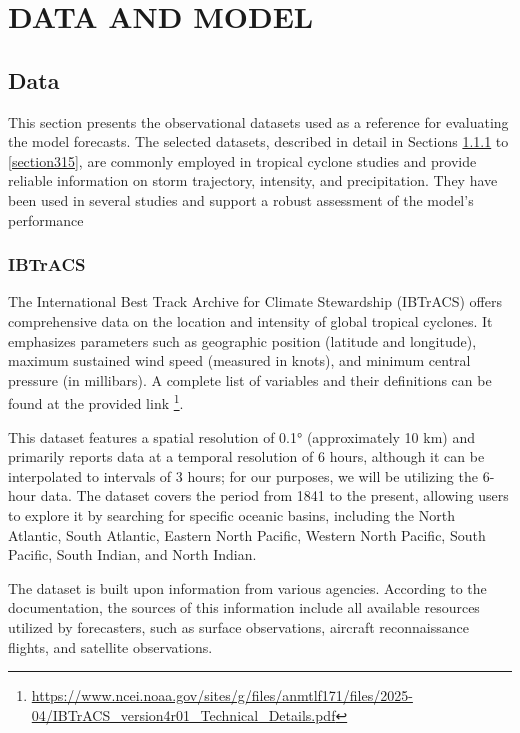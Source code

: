 \chapter{DATA AND MODEL}
\label{ch:data}

\section{Data}

This section presents the observational datasets used as a reference for evaluating the model forecasts. The selected datasets, described in detail in Sections \ref{section311} to \ref{section315}, are commonly employed in tropical cyclone studies and provide reliable information on storm trajectory, intensity, and precipitation. They have been used in several studies \cite{zhou2021regionalization, bopape2021sensitivity, dulac2024assessing, yang2024evaluation, may2024cnn} and support a robust assessment of the model's performance

\subsection{IBTrACS}
\label{section311}

The International Best Track Archive for Climate Stewardship (IBTrACS) \cite{knapp2010international} offers comprehensive data on the location and intensity of global tropical cyclones. It emphasizes parameters such as geographic position (latitude and longitude), maximum sustained wind speed (measured in knots), and minimum central pressure (in millibars). A complete list of variables and their definitions can be found at the provided link \footnote{\url{https://www.ncei.noaa.gov/sites/g/files/anmtlf171/files/2025-04/IBTrACS_version4r01_Technical_Details.pdf}}.

This dataset features a spatial resolution of 0.1° (approximately 10 km) and primarily reports data at a temporal resolution of 6 hours, although it can be interpolated to intervals of 3 hours; for our purposes, we will be utilizing the 6-hour data. The dataset covers the period from 1841 to the present, allowing users to explore it by searching for specific oceanic basins, including the North Atlantic, South Atlantic, Eastern North Pacific, Western North Pacific, South Pacific, South Indian, and North Indian.

The dataset is built upon information from various agencies. According to the documentation, the sources of this information include all available resources utilized by forecasters, such as surface observations, aircraft reconnaissance flights, and satellite observations.

